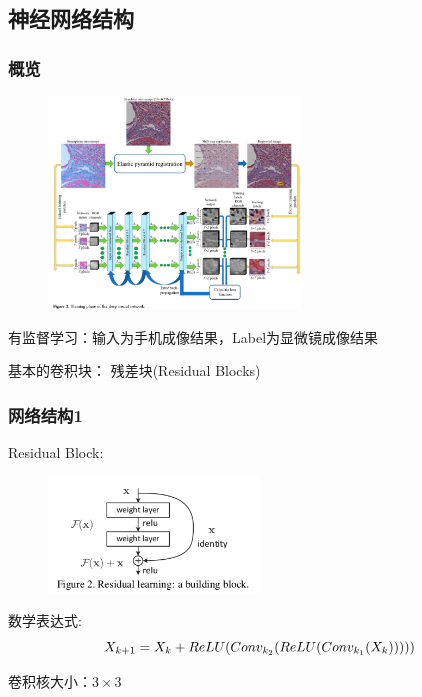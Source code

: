 \documentclass{beamer}
\begin{document}
\subsection{神经网络结构}

\begin{frame}
\tableofcontents[
sectionstyle=show/show,
subsectionstyle=show/share/hide,
currentsubsection,
]
\end{frame}

\begin{frame}
\frametitle{概览}
\begin{figure}
\centering
\includegraphics[width=0.6\textwidth]{Training.png}
\end{figure}
有监督学习：输入为手机成像结果，Label为显微镜成像结果

基本的卷积块： 残差块(Residual Blocks)
\end{frame}

\begin{frame}
\frametitle{网络结构1}
Residual Block:
\begin{figure}
\centering
\includegraphics[width=0.5\textwidth]{Residual.png}
\end{figure}

数学表达式:
\begin{displaymath}
\centering
X_{k+1}=X_{k} + ReLU(Conv_{k_2}(ReLU(Conv_{k_1}(X_k)))))
\end{displaymath}

卷积核大小：$3 \times 3$
\end{frame}
\end{document}
